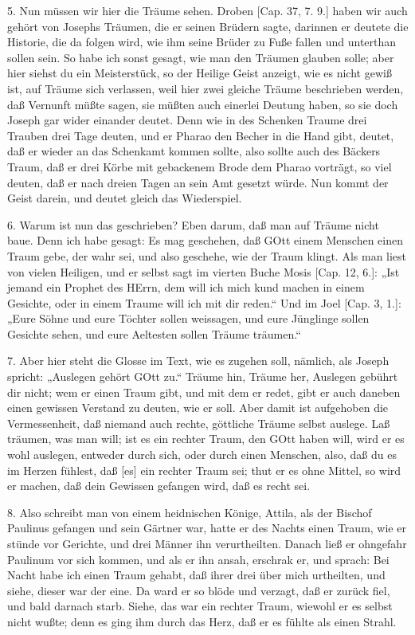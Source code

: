 5. Nun müssen wir hier die Träume sehen. Droben [Cap. 37, 7. 9.] haben wir auch gehört von Josephs Träumen, die er seinen Brüdern
sagte, darinnen er deutete die Historie, die da folgen wird, wie ihm seine Brüder zu Fuße fallen und unterthan sollen sein. So habe ich sonst gesagt, wie man den Träumen glauben solle; aber hier siehst du ein Meisterstück, so der Heilige Geist anzeigt, wie es nicht gewiß ist, auf Träume sich verlassen, weil hier zwei gleiche Träume beschrieben werden, daß Vernunft müßte sagen, sie müßten auch einerlei Deutung haben, so sie doch Joseph gar wider einander deutet. Denn wie in des Schenken Traume drei Trauben drei Tage deuten, und er Pharao den Becher in die Hand gibt, deutet, daß er wieder an das Schenkamt kommen sollte, also sollte auch des Bäckers Traum, daß er drei Körbe mit gebackenem Brode dem Pharao vorträgt, so viel deuten, daß er nach dreien Tagen an sein Amt gesetzt würde. Nun kommt der Geist darein, und deutet gleich das Wiederspiel.

6. Warum ist nun das geschrieben? Eben darum, daß man auf Träume nicht baue. Denn ich habe gesagt: Es mag geschehen, daß GOtt einem Menschen einen Traum gebe, der wahr sei, und also geschehe, wie der Traum klingt. Als man liest von vielen Heiligen, und er selbst sagt im vierten Buche Mosis [Cap. 12, 6.]: „Ist jemand ein Prophet des HErrn, dem will ich mich kund machen in einem Gesichte, oder in einem Traume will ich mit dir reden.“ Und im Joel [Cap. 3, 1.]: „Eure Söhne und eure Töchter sollen weissagen, und eure Jünglinge sollen Gesichte sehen, und eure Aeltesten sollen Träume träumen.“

7. Aber hier steht die Glosse im Text, wie es zugehen soll, nämlich, als Joseph spricht: „Auslegen gehört GOtt zu.“ Träume hin, Träume her, Auslegen gebührt dir nicht; wem er einen Traum gibt, und mit dem er redet, gibt er auch daneben einen gewissen Verstand zu deuten, wie er soll. Aber damit ist aufgehoben die Vermessenheit, daß niemand auch rechte, göttliche Träume selbst auslege. Laß träumen, was man will; ist es ein rechter Traum, den GOtt haben will, wird er es wohl auslegen, entweder durch sich, oder durch einen Menschen, also, daß du es im Herzen fühlest, daß [es] ein rechter Traum sei; thut er es ohne Mittel, so wird er machen, daß dein Gewissen gefangen wird, daß es recht sei.

8. Also schreibt man von einem heidnischen Könige, Attila, als der Bischof Paulinus gefangen und sein Gärtner war, hatte er des Nachts einen Traum, wie er stünde vor Gerichte, und drei Männer ihn verurtheilten. Danach ließ er ohngefahr Paulinum vor sich kommen, und als er ihn ansah, erschrak er, und sprach: Bei Nacht habe ich einen Traum gehabt, daß ihrer drei über mich urtheilten, und siehe, dieser war der eine. Da ward er so blöde und verzagt, daß er zurück fiel, und bald darnach starb. Siehe, das war ein rechter Traum, wiewohl er es selbst nicht wußte; denn es ging ihm durch das Herz, daß er es fühlte als einen Strahl.

